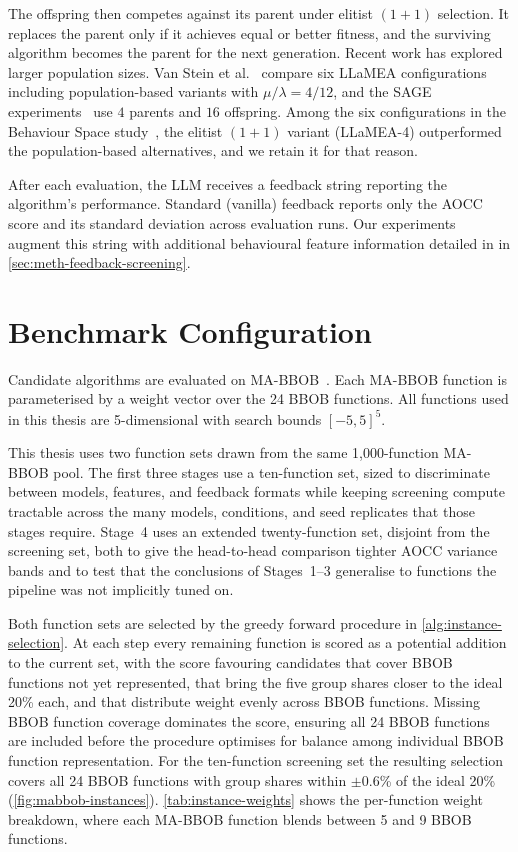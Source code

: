 The offspring then competes against its parent under elitist $(1+1)$ selection. It replaces the parent only if it achieves equal or better fitness, and the surviving algorithm becomes the parent for the next generation. Recent work has explored larger population sizes. Van Stein et al.~\cite{vanStein2025Behaviour} compare six LLaMEA configurations including population-based variants with $\mu/\lambda = 4/12$, and the SAGE experiments~\cite{vanStein2026LLaMEASAGE} use $4$ parents and $16$ offspring. Among the six configurations in the Behaviour Space study~\cite{vanStein2025Behaviour}, the elitist $(1+1)$ variant (LLaMEA-4) outperformed the population-based alternatives, and we retain it for that reason.

After each evaluation, the LLM receives a feedback string reporting the algorithm's performance. Standard (vanilla) feedback reports only the AOCC score and its standard deviation across evaluation runs. Our experiments augment this string with additional behavioural feature information detailed in in \cref{sec:meth-feedback-screening}.

\section{Benchmark Configuration}
\label{sec:meth-benchmark}

Candidate algorithms are evaluated on MA-BBOB~\cite{vermetten2023mabbob}. Each MA-BBOB function is parameterised by a weight vector over the 24 BBOB functions. All functions used in this thesis are 5-dimensional with search bounds $[-5, 5]^5$.

This thesis uses two function sets drawn from the same 1{,}000-function MA-BBOB pool. The first three stages use a ten-function set, sized to discriminate between models, features, and feedback formats while keeping screening compute tractable across the many models, conditions, and seed replicates that those stages require. Stage~4 uses an extended twenty-function set, disjoint from the screening set, both to give the head-to-head comparison tighter AOCC variance bands and to test that the conclusions of Stages~1--3 generalise to functions the pipeline was not implicitly tuned on.

Both function sets are selected by the greedy forward procedure in \cref{alg:instance-selection}. At each step every remaining function is scored as a potential addition to the current set, with the score favouring candidates that cover BBOB functions not yet represented, that bring the five group shares closer to the ideal 20\% each, and that distribute weight evenly across BBOB functions. Missing BBOB function coverage dominates the score, ensuring all 24 BBOB functions are included before the procedure optimises for balance among individual BBOB function representation. For the ten-function screening set the resulting selection covers all 24 BBOB functions with group shares within $\pm$0.6\% of the ideal 20\% (\cref{fig:mabbob-instances}). \cref{tab:instance-weights} shows the per-function weight breakdown, where each MA-BBOB function blends between 5 and 9 BBOB functions.

